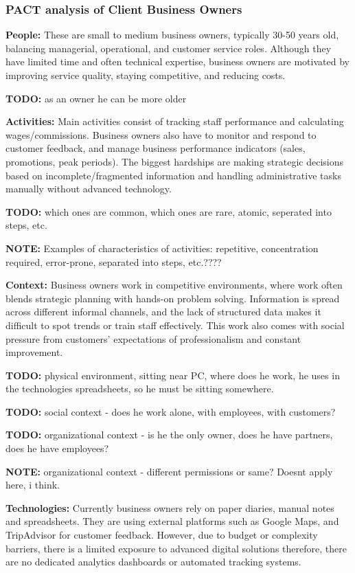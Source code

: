 \documentclass[]{VUMIFTemplateClass}
\newcommand{\noticecomment}[1]{%
    \begin{tcolorbox}[colback=blue!20, colframe=blue!60, arc=0pt, outer arc=0pt, boxrule=1pt, left=3pt, right=3pt, top=3pt, bottom=3pt]
        \textbf{\textcolor{blue!70!black}{NOTE:}} #1
    \end{tcolorbox}
}
\newcommand{\todocomment}[1]{%
    \begin{tcolorbox}[colback=red!20, colframe=red!60, arc=0pt, outer arc=0pt, boxrule=1pt, left=3pt, right=3pt, top=3pt, bottom=3pt]
        \textbf{\textcolor{orange!70!black}{TODO:}} #1
    \end{tcolorbox}
}
\begin{document}
\subsubsection{PACT analysis of Client Business Owners}
    \textbf{People:} These are small to medium business owners, typically 30-50
    years old, balancing managerial, operational, and customer service roles.
    Although they have limited time and often technical expertise, business
    owners are motivated by improving service quality, staying competitive, and
    reducing costs.

    \todocomment{as an owner he can be more older}

    \textbf{Activities:} Main activities consist of tracking staff performance
    and calculating wages/commissions. Business owners also have to monitor and
    respond to customer feedback, and manage business performance indicators
    (sales, promotions, peak periods). The biggest hardships are making
    strategic decisions based on incomplete/fragmented information and handling
    administrative tasks manually without advanced technology.
    \todocomment{which ones are common, which ones are rare, atomic, seperated into steps, etc.}
    \noticecomment{Examples of characteristics of activities: repetitive, concentration required, error-prone, separated into steps, etc.????}

    \textbf{Context:} Business owners work in competitive environments, where
    work often blends strategic planning with hands-on problem solving.
    Information is spread across different informal channels, and the lack of
    structured data makes it difficult to spot trends or train staff
    effectively. This work also comes with social pressure from customers'
    expectations of professionalism and constant improvement.
    \todocomment{physical environment, sitting near PC, where does he work, he uses in the technologies spreadsheets, so he must be sitting somewhere.}
    \todocomment{social context - does he work alone, with employees, with customers?}
    \todocomment{organizational context - is he the only owner, does he have partners, does he have employees?}
    \noticecomment{organizational context - different permissions or same? Doesnt apply here, i think.}

    \textbf{Technologies:} Currently business owners rely on paper diaries,
    manual notes and spreadsheets. They are using external platforms such as
    Google Maps, and TripAdvisor for customer feedback. However, due to budget
    or complexity barriers, there is a limited exposure to advanced digital
    solutions therefore, there are no dedicated analytics dashboards or
    automated tracking systems.
\end{document}

